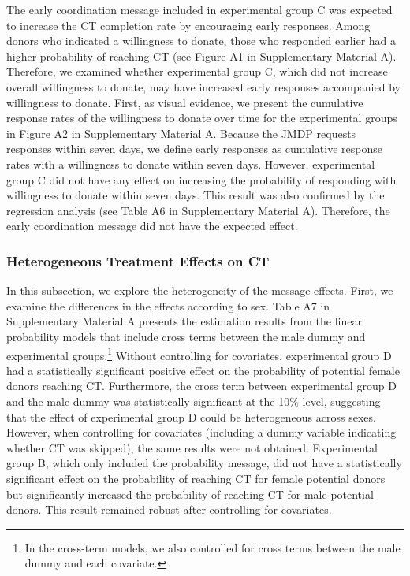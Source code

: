 \documentclass[12pt, a4paper]{article}
\begin{document}
The early coordination message included in experimental group C was expected to increase the CT completion rate by encouraging early responses. Among donors who indicated a willingness to donate, those who responded earlier had a higher probability of reaching CT (see Figure A1 in Supplementary Material A). Therefore, we examined whether experimental group C, which did not increase overall willingness to donate, may have increased early responses accompanied by willingness to donate. First, as visual evidence, we present the cumulative response rates of the willingness to donate over time for the experimental groups in Figure A2 in Supplementary Material A. Because the JMDP requests responses within seven days, we define early responses as cumulative response rates with a willingness to donate within seven days. However, experimental group C did not have any effect on increasing the probability of responding with willingness to donate within seven days. This result was also confirmed by the regression analysis (see Table A6 in Supplementary Material A). Therefore, the early coordination message did not have the expected effect.

\hypertarget{heterogeneous-treatment-effects-on-ct}{%
\subsubsection{Heterogeneous Treatment Effects on CT}\label{heterogeneous-treatment-effects-on-ct}}

In this subsection, we explore the heterogeneity of the message effects. First, we examine the differences in the effects according to sex. Table A7 in Supplementary Material A presents the estimation results from the linear probability models that include cross terms between the male dummy and experimental groups.\footnote{In the cross-term models, we also controlled for cross terms between the male dummy and each covariate.} Without controlling for covariates, experimental group D had a statistically significant positive effect on the probability of potential female donors reaching CT. Furthermore, the cross term between experimental group D and the male dummy was statistically significant at the 10\% level, suggesting that the effect of experimental group D could be heterogeneous across sexes. However, when controlling for covariates (including a dummy variable indicating whether CT was skipped), the same results were not obtained. Experimental group B, which only included the probability message, did not have a statistically significant effect on the probability of reaching CT for female potential donors but significantly increased the probability of reaching CT for male potential donors. This result remained robust after controlling for covariates.
\end{document}
